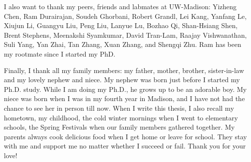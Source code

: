 I also want to thank my peers, friends and labmates at UW-Madison: Yizheng Chen, 
Ram Durairajan, Soudeh Ghorbani, Robert Grandl, Lei Kang, Yanfang Le, 
Xiujun Li, Guangyu Liu, Peng Liu, Lanyue Lu, Bozhao Qi, Shan-Hsiang Shen, 
Brent Stephens, Meenakshi Syamkumar, David Tran-Lam, Raajay Vishwanathan, 
Suli Yang, Yan Zhai, Tan Zhang, Xuan Zhang, and Shengqi Zhu. 
Ram has been my rootmate since I started my PhD.

Finally, I thank all my family members: my father, mother, brother, 
sister-in-law and my lovely nephew and niece. My nephew was born just before 
I started my Ph.D. study. While I am doing my Ph.D., he grows up to be 
an adorable boy. My niece was born when I was in my fourth year in Madison, and 
I have not had the chance to see her in person till now. When I write this thesis, 
I also recall my hometown, my childhood, the cold winter mornings when I went 
to elementary schools, the Spring Festivals when our family members gathered together. 
My parents always cook delicious food when I get home or leave for school. 
They stay with me and support me no matter whether I succeed or fail. Thank you for your love!



